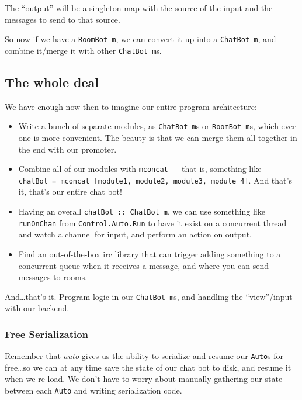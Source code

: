 \documentclass[]{article}
\begin{document}
The ``output'' will be a singleton map with the source of the input and
the messages to send to that source.

So now if we have a \texttt{RoomBot\ m}, we can convert it up into a
\texttt{ChatBot\ m}, and combine it/merge it with other
\texttt{ChatBot\ m}s.

\subsection{The whole deal}\label{the-whole-deal}

We have enough now then to imagine our entire program architecture:

\begin{itemize}
\tightlist
\item
  Write a bunch of separate modules, as \texttt{ChatBot\ m}s or
  \texttt{RoomBot\ m}s, which ever one is more convenient. The beauty is
  that we can merge them all together in the end with our promoter.
\item
  Combine all of our modules with \texttt{mconcat} --- that is,
  something like
  \texttt{chatBot\ =\ mconcat\ {[}module1,\ module2,\ module3,\ module\ 4{]}}.
  And that's it, that's our entire chat bot!
\item
  Having an overall \texttt{chatBot\ ::\ ChatBot\ m}, we can use
  something like \texttt{runOnChan} from \texttt{Control.Auto.Run} to
  have it exist on a concurrent thread and watch a channel for input,
  and perform an action on output.
\item
  Find an out-of-the-box irc library that can trigger adding something
  to a concurrent queue when it receives a message, and where you can
  send messages to rooms.
\end{itemize}

And\ldots{}that's it. Program logic in our \texttt{ChatBot\ m}s, and
handling the ``view''/input with our backend.

\subsubsection{Free Serialization}\label{free-serialization}

Remember that \emph{auto} gives us the ability to serialize and resume
our \texttt{Auto}s for free\ldots{}so we can at any time save the state
of our chat bot to disk, and resume it when we re-load. We don't have to
worry about manually gathering our state between each \texttt{Auto} and
writing serialization code.
\end{document}
